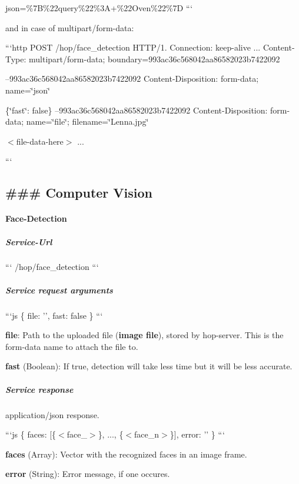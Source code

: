 json=\%7\-B\%22query\%22\%3\-A+\%22\-Oven\%22\%7\-D ```

and in case of multipart/form-\/data\-:

```http P\-O\-S\-T /hop/face\-\_\-detection H\-T\-T\-P/1. Connection\-: keep-\/alive ... Content-\/\-Type\-: multipart/form-\/data; boundary=993ac36c568042aa86582023b7422092

--993ac36c568042aa86582023b7422092 Content-\/\-Disposition\-: form-\/data; name=\char`\"{}json\char`\"{}

\{\char`\"{}fast\char`\"{}\-: false\} --993ac36c568042aa86582023b7422092 Content-\/\-Disposition\-: form-\/data; name=\char`\"{}file\char`\"{}; filename=\char`\"{}\-Lenna.\-jpg\char`\"{}

$<$file-\/data-\/here$>$ ...

``` 

 \subsection*{\#\#\# Computer Vision }

\paragraph*{Face-\/\-Detection}

\subparagraph*{Service-\/\-Url}

``` /hop/face\-\_\-detection ```

\subparagraph*{Service request arguments}

```js \{ file\-: '', fast\-: false \} ```


\begin{DoxyItemize}
\item {\bfseries file}\-: Path to the uploaded file ({\bfseries image file}), stored by hop-\/server. This is the form-\/data name to attach the file to.
\item {\bfseries fast} (Boolean)\-: If true, detection will take less time but it will be less accurate.
\end{DoxyItemize}

\subparagraph*{Service response}

application/json response.

```js \{ faces\-: \mbox{[}\{$<$face\-\_$>$\}, ..., \{$<$face\-\_\-n$>$\}\mbox{]}, error\-: '' \} ```


\begin{DoxyItemize}
\item {\bfseries faces} (Array)\-: Vector with the recognized faces in an image frame.
\item {\bfseries error} (String)\-: Error message, if one occures.
\end{DoxyItemize}

